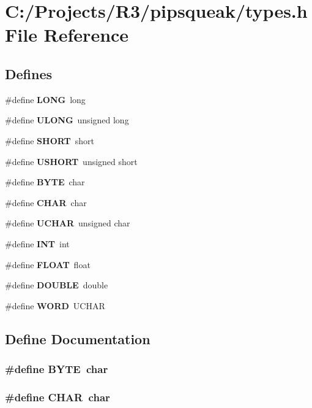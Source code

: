 \section{C:/Projects/R3/pipsqueak/types.h File Reference}
\label{pipsqueak_2types_8h}
\subsection*{Defines}
\begin{DoxyCompactItemize}
\item 
\#define {\bf LONG}~long
\item 
\#define {\bf ULONG}~unsigned long
\item 
\#define {\bf SHORT}~short
\item 
\#define {\bf USHORT}~unsigned short
\item 
\#define {\bf BYTE}~char
\item 
\#define {\bf CHAR}~char
\item 
\#define {\bf UCHAR}~unsigned char
\item 
\#define {\bf INT}~int
\item 
\#define {\bf FLOAT}~float
\item 
\#define {\bf DOUBLE}~double
\item 
\#define {\bf WORD}~UCHAR
\end{DoxyCompactItemize}


\subsection{Define Documentation}
\subsubsection[{BYTE}]{\setlength{\rightskip}{0pt plus 5cm}\#define BYTE~char}\label{pipsqueak_2types_8h_aec93e83855ac17c3c25c55c37ca186dd}
\subsubsection[{CHAR}]{\setlength{\rightskip}{0pt plus 5cm}\#define CHAR~char}\label{pipsqueak_2types_8h_a35cd67ba7bb0db8105eb6267467535d7}
